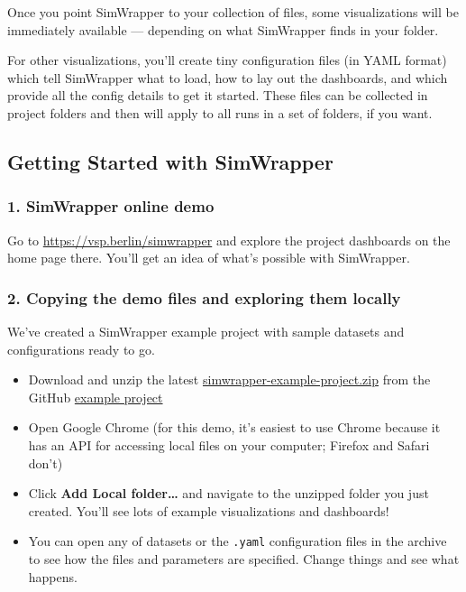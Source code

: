Once you point SimWrapper to your collection of files, some
visualizations will be immediately available --- depending on what
SimWrapper finds in your folder.

For other visualizations, you'll create tiny configuration files (in
YAML format) which tell SimWrapper what to load, how to lay out the
dashboards, and which provide all the config details to get it started.
These files can be collected in project folders and then will apply to
all runs in a set of folders, if you want.

\hypertarget{getting-started-with-simwrapper}{%
\subsection{Getting Started with
SimWrapper}\label{getting-started-with-simwrapper}}

\hypertarget{simwrapper-online-demo}{%
\subsubsection{1. SimWrapper online demo}\label{simwrapper-online-demo}}

Go to \url{https://vsp.berlin/simwrapper} and explore the project
dashboards on the home page there. You'll get an idea of what's possible
with SimWrapper.

\hypertarget{copying-the-demo-files-and-exploring-them-locally}{%
\subsubsection{2. Copying the demo files and exploring them
locally}\label{copying-the-demo-files-and-exploring-them-locally}}

We've created a SimWrapper example project with sample datasets and
configurations ready to go.

\begin{itemize}
  \tightlist
  \item
    Download and unzip the latest
\href{https://github.com/simwrapper/simwrapper-example-project/archive/refs/heads/main.zip}{simwrapper-example-project.zip}
from the GitHub
\href{https://github.com/simwrapper/simwrapper-example-project}{example
project}
  \item Open Google Chrome (for this demo, it's easiest to use Chrome
because it has an API for accessing local files on your computer;
Firefox and Safari don't)
  \item Click \textbf{Add Local folder\ldots{}} and
navigate to the unzipped folder you just created. You'll see lots of
example visualizations and dashboards!
  \item You can open any of datasets or
the \texttt{.yaml} configuration files in the archive to see how the
files and parameters are specified. Change things and see what happens.
\end{itemize}

